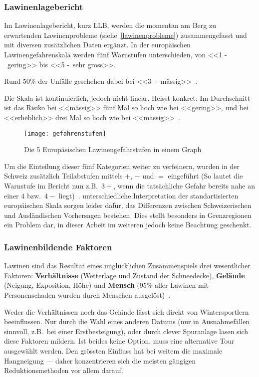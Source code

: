 \subsubsection{Lawinenlagebericht}

Im Lawinenlagebericht, kurz LLB, werden die momentan am Berg zu erwartenden Lawinenprobleme (siehe~\ref{lawinenprobleme}) zusammengefasst und mit diversen zusätzlichen Daten ergänzt.
In der europäischen Lawinengefahrenskala werden fünf Warnstufen unterschieden, von <<1 -~gering>> bis <<5 -~sehr gross>>.~\cite{lawinengefskala}

Rund 50\% der Unfälle geschehen dabei bei <<3~-~mässig>>~\cite{achtunglawine}.

Die Skala ist kontinuierlich, jedoch nicht linear. Heisst konkret: 
Im Durchschnitt ist das Risiko bei <<mässig>> fünf Mal so hoch wie bei <<gering>>, und bei <<erheblich>> drei Mal so hoch wie bei <<mässig>>~\cite{sacbergspwinter}.

\begin{figure}[H]
  \centering
  \texttt{[image: gefahrenstufen]}
  \caption{Die 5 Europäsischen Lawinengefahrstufen in einem Graph}
\end{figure}

Um die Einteilung dieser fünf Kategorien weiter zu verfeinern, wurden in der Schweiz zusätzlich Teilabstufen mittels $+$, $-$ und $=$ eingeführt (So lautet die Warnstufe im Bericht nun z.B.\ $3+$, wenn die tatsächliche Gefahr bereits nahe an einer $4$ bzw.\ $4-$ liegt)~\cite{sacbergspwinter}.
unterschiedliche Interpretation der standartisierten europäischen Skala sorgen leider dafür, das Differenzen zwischen Schweizerischen und Ausländischen Vorhersagen bestehen. Dies stellt besonders in Grenzregionen ein Problem dar, in dieser Arbeit im weiteren jedoch keine Beachtung geschenkt.


\subsubsection{Lawinenbildende Faktoren}

Lawinen sind das Resultat eines unglücklichen Zusammenspiels drei wesentlicher Faktoren: 
\textbf{Verhältnisse} (Wetterlage und Zustand der Schneedecke), \textbf{Gelände} (Neigung, Exposition, Höhe) und \textbf{Mensch} (95\% aller Lawinen mit Personenschaden wurden durch Menschen ausgelöst)~\cite{ortovoxlabsnow}.

Weder die Verhältnissen noch das Gelände lässt sich direkt von Wintersportlern beeinflussen. Nur durch die Wahl eines anderen Datums (nur in Ausnahmefällen sinnvoll, z.B.\ bei einer Erstbesteigung), oder durch clever Spuranlage lasen sich diese Faktoren mildern. 
Ist beides keine Option, muss eine alternative Tour ausgewählt werden.
Den grössten Einfluss hat bei weitem die maximale Hangneigung --- daher konzentrieren sich die meisten gängigen Reduktionsmethoden vor allem darauf.

